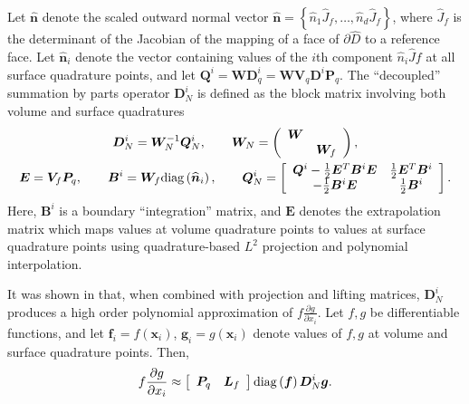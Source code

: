 \documentclass{svjour3}                     %
\renewcommand{\hat}{\widehat}
\newcommand{\diag}[1]{{\rm diag}\LRp{#1}}
\newcommand{\pd}[2]{\frac{\partial#1}{\partial#2}}
\newcommand{\LRp}[1]{\left( #1 \right)}
\newcommand{\LRs}[1]{\left[ #1 \right]}
\newcommand{\LRc}[1]{\left\{ #1 \right\}}
\begin{document}
Let $\hat{\bm{n}}$ denote the scaled outward normal vector $\hat{\bm{n}} = \LRc{\hat{n}_1\hat{J}_f,\ldots,\hat{n}_d\hat{J}_f}$, where $\hat{J}_f$ is the determinant of the Jacobian of the mapping of a face of $\partial \hat{D}$ to a reference face.  Let $\hat{\bm{n}}_i$ denote the vector containing values of the $i$th component $\hat{n}_i\hat{J}f$ at all surface quadrature points, and let $\bm{Q}^i = \bm{W}\bm{D}^i_q = \bm{W}\bm{V}_q\bm{D}^i\bm{P}_q$.  The ``decoupled'' summation by parts operator $\bm{D}^i_N$ is defined as the block matrix involving both volume and surface quadratures
\begin{gather}
\bm{D}^i_N = \bm{W}_N^{-1} \bm{Q}^i_N, \qquad \bm{W}_N = \LRp{\begin{array}{cc}\bm{W}&\\ & \bm{W}_f\end{array}}, \label{eq:QN}\\
\bm{E} = \bm{V}_f\bm{P}_q, \qquad \bm{B}^i = \bm{W}_f \diag{\hat{\bm{n}}_i}, \qquad \bm{Q}^i_N  = \LRs{
\begin{array}{cc}
\bm{Q}^i - \frac{1}{2}\bm{E}^T\bm{B}^i\bm{E} &  \frac{1}{2}\bm{E}^T\bm{B}^i\\
-\frac{1}{2}\bm{B}^i\bm{E} & \frac{1}{2} \bm{B}^i
\end{array}}.  \nonumber
\end{gather}
Here, $\bm{B}^i$ is a boundary ``integration'' matrix, and $\bm{E}$ denotes the extrapolation matrix which maps values at volume quadrature points to values at surface quadrature points using quadrature-based $L^2$ projection and polynomial interpolation.  

It was shown in \cite{chan2017discretely, chan2018efficient} that, when combined with projection and lifting matrices, $\bm{D}^i_N$ produces a high order polynomial approximation of $f\pd{g}{x_i}$. 
Let $f, g$ be differentiable functions, and let $\bm{f}_i = f(\bm{x}_i)$, $\bm{g}_i = g(\bm{x}_i)$ denote values of $f,g$ at volume and surface quadrature points.  Then,
\begin{gather}
f\pd{g}{x_i} \approx \LRs{\begin{array}{cc}
\bm{P}_q & \bm{L}_f\end{array}} {\rm diag}\LRp{\bm{f}}\bm{D}^i_N \bm{g}.  
\label{eq:dnapprox}
\end{gather}
\end{document}
